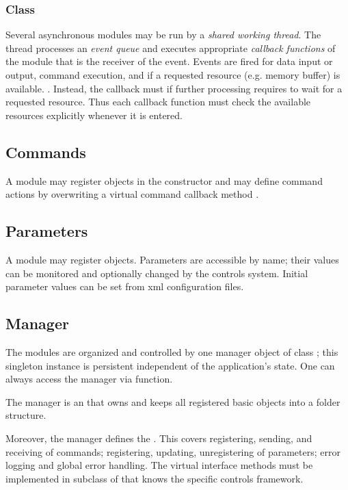 \subsubsection{Class }
 Several asynchronous modules may be run by a {\sl shared working thread}. 
The thread processes an  {\sl event queue} and executes 
appropriate  {\sl callback functions} 
of the module that is the receiver of the event. Events are fired for data input 
or output, command execution, and if a requested resource (e.g. memory buffer) 
is available. . 
Instead, the callback must  if further processing requires 
to wait for a requested resource. Thus each callback function must check the 
available resources explicitly whenever it is entered.
           
\subsection{Commands}
A module may register  objects in the constructor and may define 
command actions by overwriting a virtual command callback method .

\subsection{Parameters}
A module may register   objects. 
Parameters are accessible by name; their values can be monitored and optionally changed by 
the controls system. Initial parameter values can be set from xml configuration files.   

\subsection{Manager}
The modules are organized and controlled by one manager object of 
class ;
this singleton instance is persistent independent of the application's state.
One can always access the manager via  function.

The manager is an  that owns and keeps all 
registered basic objects into a folder structure. 

Moreover, the manager defines the . 
This covers registering, sending, and receiving of commands; registering, 
updating, unregistering of parameters; error logging and global error handling. 
The virtual interface methods must be implemented in subclass of  that 
knows the specific controls framework.


